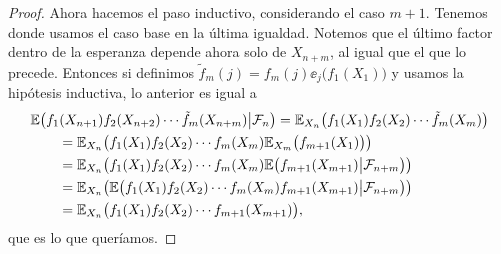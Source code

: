 \begin{proof}
Ahora hacemos el paso inductivo, considerando el caso $m+1$.
Tenemos
donde usamos el caso base en la última igualdad.
Notemos que el último factor dentro de la esperanza depende ahora solo de $X_{n+m}$, al igual que el que lo precede.
Entonces si definimos $\tilde f_m(j)=f_m(j)\ee_{j}\big(f_1(X_1)\big)$ y usamos la hipótesis inductiva, lo anterior es igual a
\begin{align}
&\mathbb{E}\big(f_1(X_{n+1})f_2(X_{n+2})\dotsm \tilde f_{m}(X_{n+m})\big|\mathcal{F}_n\big)
=\mathbb{E}_{X_n}\big(f_1(X_{1})f_2(X_{2})\dotsm \tilde f_{m}(X_{m})\big)\\
&\qquad=\mathbb{E}_{X_n}\big(f_1(X_{1})f_2(X_{2})\dotsm f_{m}(X_{m})\mathbb{E}_{X_{m}}\big(f_{m+1}(X_1)\big)\big)\\
&\qquad=\mathbb{E}_{X_n}\big(f_1(X_{1})f_2(X_{2})\dotsm f_{m}(X_{m})\mathbb{E}\big(f_{m+1}(X_{m+1})\big|\mathcal{F}_{n+m}\big)\big)\\
&\qquad=\mathbb{E}_{X_n}\big(\mathbb{E}\big(f_1(X_{1})f_2(X_{2})\dotsm f_{m}(X_{m})f_{m+1}(X_{m+1})\big|\mathcal{F}_{n+m}\big)\big)\\
&\qquad=\mathbb{E}_{X_n}\big(f_1(X_{1})f_2(X_{2})\dotsm f_{m+1}(X_{m+1})\big),
\end{align}
que es lo que queríamos.


\end{proof}

